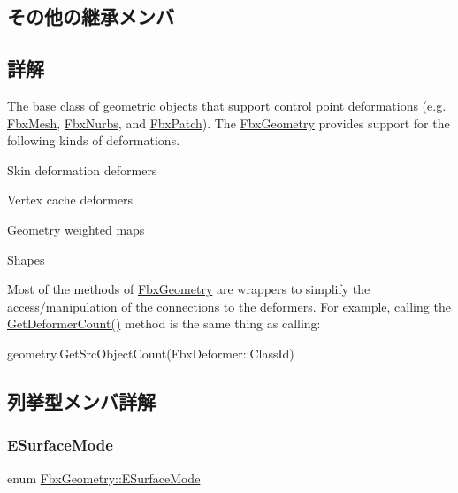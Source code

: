 \subsection*{その他の継承メンバ}


\subsection{詳解}
The base class of geometric objects that support control point deformations (e.\+g. \hyperlink{class_fbx_mesh}{Fbx\+Mesh}, \hyperlink{class_fbx_nurbs}{Fbx\+Nurbs}, and \hyperlink{class_fbx_patch}{Fbx\+Patch}). The \hyperlink{class_fbx_geometry}{Fbx\+Geometry} provides support for the following kinds of deformations.

\begin{DoxyItemize}
\item Skin deformation deformers \item Vertex cache deformers \item Geometry weighted maps \item Shapes\end{DoxyItemize}
Most of the methods of \hyperlink{class_fbx_geometry}{Fbx\+Geometry} are wrappers to simplify the access/manipulation of the connections to the deformers. For example, calling the \hyperlink{class_fbx_geometry_a8cca6f160b52ee1ffd799c599c36f784}{Get\+Deformer\+Count()} method is the same thing as calling\+:


\begin{DoxyCode}
geometry.GetSrcObjectCount(FbxDeformer::ClassId)
\end{DoxyCode}
 

\subsection{列挙型メンバ詳解}
\mbox{\label{class_fbx_geometry_adb9d2e34481a2cb40f1d783c665794db}} 
\subsubsection{\texorpdfstring{E\+Surface\+Mode}{ESurfaceMode}}
{\footnotesize\ttfamily enum \hyperlink{class_fbx_geometry_adb9d2e34481a2cb40f1d783c665794db}{Fbx\+Geometry\+::\+E\+Surface\+Mode}}

